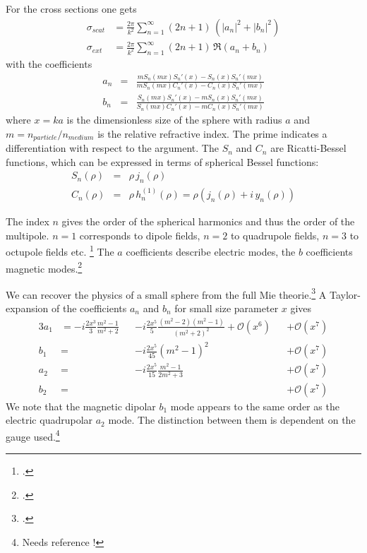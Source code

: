 For the cross sections one gets
\begin{eqnarray}
\sigma_{scat} & = \frac{2 \pi }{k^2} \sum\limits_{n=1}^{\infty} (2 n+1) \, \left( |a_n|^2 + |b_n|^2 \right) \\
\sigma_{ext} & = \frac{2 \pi }{k^2} \sum\limits_{n=1}^{\infty} ( 2n+1)\, \Re \left( a_n + b_n \right) 
\end{eqnarray}
%
with the coefficients
%
\begin{eqnarray}
 a_n &= & \frac{m S_n (m x) S_n' (x) - S_n (x) S_n' (m x)}
 {m S_n (m x) C_n' (x) -  C_n (x) S_n' (m x)}  \\
 b_n &=  &\frac{S_n (m x) S_n' (x) - m S_n (x) S_n' (mx)}
  {S_n (mx) C_n' (x) - m C_n (x) S_n' (m x)} 
\end{eqnarray}
where $x =k a $ is the dimensionless size of the sphere with radius $a$ and $m = n_{particle} / n_{medium}$ is the relative refractive index. The prime indicates a differentiation with respect to the argument. The $S_n$ and $C_n$ are Ricatti-Bessel functions, which can be expressed in terms of spherical Bessel functions:
\begin{eqnarray}
S_n ( \rho) & =& \rho \, j_n (\rho) \\
C_n (\rho)  &= & \rho \, h_n^{(1)} (\rho)  = \rho \left(  j_n (\rho)  + i \,  y_n (\rho) \right)
\end{eqnarray}

The index $n$ gives the order of the spherical harmonics and thus the order of the multipole. $n=1$ corresponds to dipole fields, $n=2$ to quadrupole fields, $n=3$ to octupole fields etc. \footcite{KV-book} The $a$ coefficients describe electric modes, the $b$ coefficients magnetic modes.\footcite{KV-book, BH-book} 


We can recover the physics of a small sphere from the full Mie theorie.\footcite[chapter 5]{BH-book} A Taylor-expansion of the coefficients $a_n$ and $b_n$ for small size parameter $x$ gives
\begin{alignat}{3}
 a_1 &= -i \frac{2x^3}{3} \frac{m^2 -1}{m^2 + 2} && -i \frac{2x^5}{5} \frac{(m^2 -2)(m^2-1)}{(m^2 + 2)^2} + \mathcal{O}(x^6)  && + \mathcal{O}(x^7) \\
 b_1 &=  && -i \frac{2x^5}{45} (m^2 -1)^2  &&+ \mathcal{O}(x^7)  \\
 a_2 &=   &&-i \frac{2x^5}{15} \frac{m^2-1}{2 m^2 +3} &&+ \mathcal{O}(x^7)  \\
b_2 &= && &&+ \mathcal{O}(x^7)  
\end{alignat}
We note that the magnetic dipolar $b_1$ mode appears to the same order as the electric quadrupolar $a_2$ mode. The distinction between them is dependent on the gauge used.\footnote{Needs reference !}

